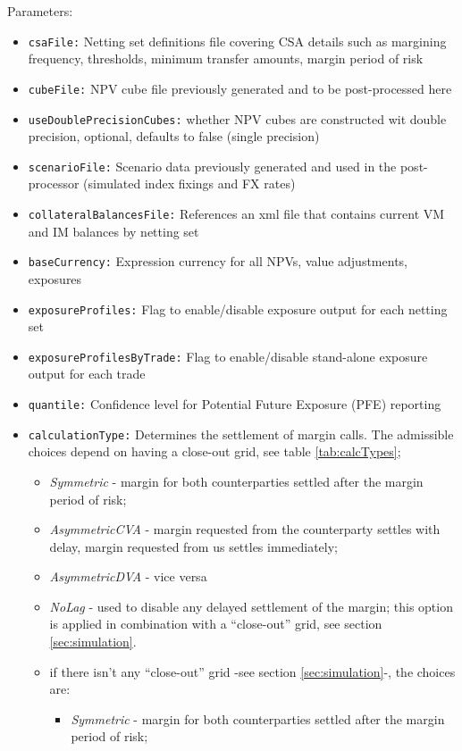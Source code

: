 {Parameters:
\begin{itemize}
\item {\tt csaFile:} Netting set definitions file covering CSA details such as margining frequency, thresholds, minimum
transfer amounts, margin period of risk
\item {\tt cubeFile:} NPV cube file previously generated and to be post-processed here
\item {\tt useDoublePrecisionCubes:} whether NPV cubes are constructed wit double precision, optional, defaults to false (single precision)
\item {\tt scenarioFile:} Scenario data previously generated and used in the post-processor (simulated index fixings and
FX rates)
\item {\tt collateralBalancesFile:} References an xml file that contains current VM and IM balances by netting set
\item {\tt baseCurrency:} Expression currency for all NPVs, value adjustments, exposures
\item {\tt exposureProfiles:} Flag to enable/disable exposure output for each netting set
\item {\tt exposureProfilesByTrade:} Flag to enable/disable stand-alone exposure output for each trade
\item {\tt quantile:} Confidence level for Potential Future Exposure (PFE) reporting
\item {\tt calculationType:} Determines the settlement of margin calls. The admissible choices depend on having a close-out grid, see table \ref{tab:calcTypes}; \\
  \begin{itemize}
  \item {\em Symmetric} - margin for both counterparties settled after the margin period of risk; 
  \item {\em AsymmetricCVA} - margin requested from the counterparty settles with delay,
    margin requested from us settles immediately; 
  \item {\em AsymmetricDVA} - vice versa 
  \item {\em NoLag} - used to disable any delayed settlement of the margin; this option is applied in combination with a ``close-out'' grid, see section \ref{sec:simulation}. 
  \item if there isn't any ``close-out'' grid -see section \ref{sec:simulation}-, the choices are:
    \begin{itemize}
    \item {\em Symmetric} - margin for both counterparties settled after the margin period of risk;

\end{itemize}
\end{itemize}
\end{itemize}}
